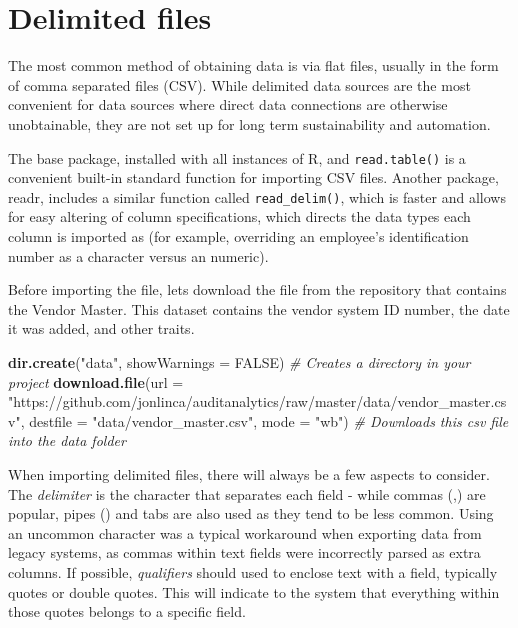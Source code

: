 \documentclass[
]{book}
\newenvironment{Shaded}{\begin{snugshade}}{\end{snugshade}}
\newcommand{\CommentTok}[1]{\textcolor[rgb]{0.56,0.35,0.01}{\textit{#1}}}
\newcommand{\DataTypeTok}[1]{\textcolor[rgb]{0.13,0.29,0.53}{#1}}
\newcommand{\KeywordTok}[1]{\textcolor[rgb]{0.13,0.29,0.53}{\textbf{#1}}}
\newcommand{\NormalTok}[1]{#1}
\newcommand{\OtherTok}[1]{\textcolor[rgb]{0.56,0.35,0.01}{#1}}
\newcommand{\StringTok}[1]{\textcolor[rgb]{0.31,0.60,0.02}{#1}}
\begin{document}
\hypertarget{delimited-files}{%
\section{Delimited files}\label{delimited-files}}

The most common method of obtaining data is via flat files, usually in the form of comma separated files (CSV). While delimited data sources are the most convenient for data sources where direct data connections are otherwise unobtainable, they are not set up for long term sustainability and automation.

The base package, installed with all instances of R, and \texttt{read.table()} is a convenient built-in standard function for importing CSV files. Another package, readr, includes a similar function called \texttt{read\_delim()}, which is faster and allows for easy altering of column specifications, which directs the data types each column is imported as (for example, overriding an employee's identification number as a character versus an numeric).

Before importing the file, lets download the file from the repository that contains the Vendor Master. This dataset contains the vendor system ID number, the date it was added, and other traits.

\begin{Shaded}
\begin{Highlighting}[]
\KeywordTok{dir.create}\NormalTok{(}\StringTok{"data"}\NormalTok{, }\DataTypeTok{showWarnings =} \OtherTok{FALSE}\NormalTok{) }\CommentTok{# Creates a directory in your project}
\KeywordTok{download.file}\NormalTok{(}\DataTypeTok{url =} \StringTok{"https://github.com/jonlinca/auditanalytics/raw/master/data/vendor_master.csv"}\NormalTok{,}
              \DataTypeTok{destfile =} \StringTok{"data/vendor_master.csv"}\NormalTok{, }\DataTypeTok{mode =} \StringTok{"wb"}\NormalTok{) }\CommentTok{# Downloads this csv file into the data folder}
\end{Highlighting}
\end{Shaded}

When importing delimited files, there will always be a few aspects to consider. The \emph{delimiter} is the character that separates each field - while commas (,) are popular, pipes (\textbar) and tabs are also used as they tend to be less common. Using an uncommon character was a typical workaround when exporting data from legacy systems, as commas within text fields were incorrectly parsed as extra columns. If possible, \emph{qualifiers} should used to enclose text with a field, typically quotes or double quotes. This will indicate to the system that everything within those quotes belongs to a specific field.
\end{document}
